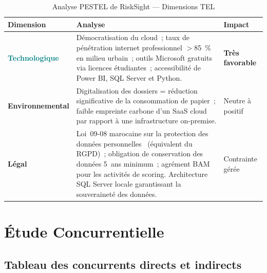 \documentclass[12pt, a4paper]{report}
\begin{document}
\begin{table}[H]
\centering
\caption{Analyse PESTEL de RiskSight --- Dimensions TEL}
\label{tab:pestel_tel}
\renewcommand{\arraystretch}{1.4}
\begin{tabularx}{\textwidth}{>{\bfseries}p{4cm} X p{3cm}}
\toprule
\rowcolor{primary!12}
Dimension & Analyse & Impact \\
\midrule
\textcolor{teal}{Technologique}
  & Démocratisation du cloud~; taux de pénétration internet professionnel
    $>$85~\% en milieu urbain~; outils Microsoft gratuits via licences
    étudiantes~; accessibilité de Power BI, SQL Server et Python.
  & \textcolor{successcolor}{\textbf{Très favorable}} \\
\midrule
\textcolor{green!50!black}{Environnemental}
  & Digitalisation des dossiers = réduction significative de la consommation
    de papier~; faible empreinte carbone d'un SaaS cloud par rapport à une
    infrastructure on-premise.
  & Neutre à positif \\
\midrule
\textcolor{dangercolor}{Légal}
  & Loi~09-08 marocaine sur la protection des données personnelles~\cite{loi0908}
    (équivalent du RGPD)~; obligation de conservation des données 5~ans minimum~;
    agrément BAM pour les activités de scoring. Architecture SQL Server locale
    garantissant la souveraineté des données.
  & Contrainte gérée \\
\bottomrule
\end{tabularx}
\end{table}

\newpage
\section{Étude Concurrentielle}

\subsection{Tableau des concurrents directs et indirects}
\end{document}
